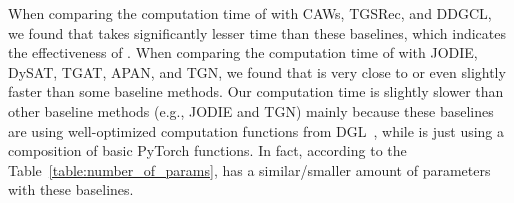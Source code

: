 \begin{table}[h]
\caption{Comparison on the wall-clock computation time for single-epoch of training. 
}
\label{table:compute_time}
\vspace{-4mm}
\centering
\centering\setlength{\tabcolsep}{6mm}
\vspace{-3mm}
\end{table}

When comparing the computation time of \our with CAWs, TGSRec, and DDGCL, we found that \our takes significantly lesser time than these baselines, which indicates the effectiveness of \oure.
When comparing the computation time of \our with JODIE, DySAT, TGAT, APAN, and TGN, we found that \our  is very close to or even slightly faster than some baseline methods. Our computation time is slightly slower than other baseline methods (e.g., JODIE and TGN) mainly because these baselines are using well-optimized computation functions from DGL~\cite{wang2019dgl}, while \our is just using a composition of basic PyTorch functions.
In fact, according to the Table~\ref{table:number_of_params}, \our has a similar/smaller amount of parameters with these baselines.

